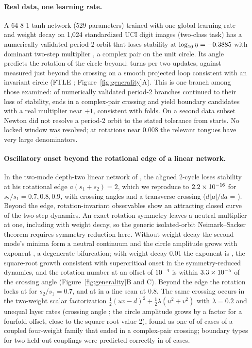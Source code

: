 \documentclass[11pt,letterpaper]{article}
\begin{document}
\paragraph{Real data, one learning rate.} A 64-8-1 tanh network (529 parameters) trained with one global learning
rate and weight decay on 1{,}024 standardized UCI digit images (two-class task) has a numerically validated period-2 orbit that
loses stability at $\log_{10}\eta = -0.3885$ with dominant two-step multiplier \tRDMultiplier{}, a complex pair on
the unit circle. Its angle predicts the rotation of the circle beyond: \xRDPredicted{} turns per two updates,
against \xRDMeasured{} measured just beyond the crossing on a smooth projected loop consistent with an invariant circle (FTLE \xRDMeasuredFtle{};
Figure~\ref{fig:generality}A). This is one branch among those examined: of \nRDCertifiedBranches{} numerically validated period-2
branches continued to their loss of stability, \nRDNSBranches{} ends in a complex-pair crossing and \nRDFoldBranches{}
yield boundary candidates with a real multiplier near $+1$, consistent with folds. On a second data subset Newton did not resolve a period-2 orbit to the stated tolerance from \nRDUncertified{} starts. No
locked window was resolved; at rotations near 0.008 the relevant tongues have very large denominators.

\paragraph{Oscillatory onset beyond the rotational edge of a linear network.} In the two-mode depth-two linear network of
\citet{hofmann2026}, the aligned 2-cycle loses stability at his rotational edge $a(s_1+s_2)=2$, which we reproduce to
$2.2\times10^{-16}$ for $s_2/s_1 = 0.7, 0.8, 0.9$, with crossing angles \tMMBirth{} and a transverse crossing
($d|\mu|/da$ = \tMMTransversality{}). Beyond the edge, rotation-invariant observables show an attracting closed curve of the
two-step dynamics. An exact rotation symmetry leaves a neutral multiplier at one, including with weight decay,
so the generic isolated-orbit Neimark--Sacker theorem requires symmetry reduction here. Without weight decay the second mode's minima form a neutral continuum and the circle amplitude grows
with exponent \tMMSlopeNoWD{}, a degenerate bifurcation; with weight decay 0.01 the exponent is \tMMSlopeWD{}, the
square-root growth consistent with supercritical onset in the symmetry-reduced dynamics, and the rotation number at an offset of
$10^{-4}$ is within $3.3\times10^{-5}$ of the crossing angle (Figure~\ref{fig:generality}B and C). Beyond
the edge the rotation locks at \tMMLockedSeven{} for $s_2/s_1 = 0.7$, and at \tMMLockedEight{} in a fine scan at
$0.8$. The same crossing occurs in the two-weight scalar factorization $\tfrac12(uv-d)^2 + \tfrac12\lambda(u^2+v^2)$
with $\lambda = 0.2$ and unequal layer rates (crossing angle \xMMTwoWeightAngle{}; the circle amplitude grows by a
factor \xMMTwoWeightAmpRatio{} for a fourfold offset, close to the square-root value 2), found as one of
\nMMGridNS{} of \nMMGrid{} cases of a coupled four-weight family that ended in a complex-pair crossing; boundary types
for two held-out couplings were predicted correctly in \nMMHeldoutCorrect{} of \nMMHeldout{} cases.
\end{document}
